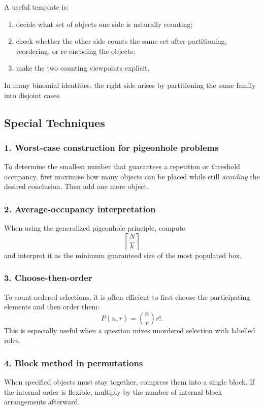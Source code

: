 \begin{extension}[title={How to invent a combinatorial proof}]
A useful template is:
\begin{enumerate}[leftmargin=*]
    \item decide what set of objects one side is naturally counting;
    \item check whether the other side counts the same set after partitioning, reordering, or re-encoding the objects;
    \item make the two counting viewpoints explicit.
\end{enumerate}
In many binomial identities, the right side arises by partitioning the same family into disjoint cases.
\end{extension}

\subsection{Special Techniques}

\subsubsection*{1. Worst-case construction for pigeonhole problems}
To determine the smallest number that guarantees a repetition or threshold occupancy, first maximise how many objects can be placed while still \emph{avoiding} the desired conclusion. Then add one more object.

\subsubsection*{2. Average-occupancy interpretation}
When using the generalized pigeonhole principle, compute
\[
\left\lceil \frac{N}{k}\right\rceil
\]
and interpret it as the minimum guaranteed size of the most populated box.

\subsubsection*{3. Choose-then-order}
To count ordered selections, it is often efficient to first choose the participating elements and then order them:
\[
P(n,r)=\binom{n}{r}r!.
\]
This is especially useful when a question mixes unordered selection with labelled roles.

\subsubsection*{4. Block method in permutations}
When specified objects must stay together, compress them into a single block. If the internal order is flexible, multiply by the number of internal block arrangements afterward.


